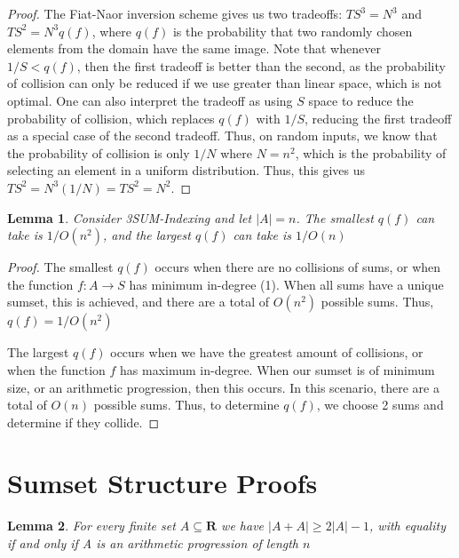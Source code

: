 \documentclass{article}
\newtheorem{lemma}{Lemma}
\begin{document}
\begin{proof}
The Fiat-Naor inversion scheme gives us two tradeoffs: $TS^3 = N^3$ and $TS^2 = N^3q(f)$, where $q(f)$ is the probability that two randomly chosen elements from the domain have the same image. Note that whenever $1/S < q(f)$, then the first tradeoff is better than the second, as the probability of collision can only be reduced if we use greater than linear space, which is not optimal. One can also interpret the tradeoff as using $S$ space to reduce the probability of collision, which replaces $q(f)$ with $1/S$, reducing the first tradeoff as a special case of the second tradeoff. Thus, on random inputs, we know that the probability of collision is only $1/N$ where $N=n^2$, which is the probability of selecting an element in a uniform distribution. Thus, this gives us $TS^2 = N^3(1/N) = TS^2 = N^2$.
\end{proof}

\begin{lemma}
\label{Min and Max q(f) values}
Consider 3SUM-Indexing and let $|A| = n$. The smallest $q(f)$ can take is $1/O(n^2)$, and the largest $q(f)$ can take is $1/O(n)$
\end{lemma}

\begin{proof} %
The smallest $q(f)$ occurs when there are no collisions of sums, or when the function $f: A \rightarrow S$ has minimum in-degree (1). When all sums have a unique sumset, this is achieved, and there are a total of $O(n^2)$ possible sums. Thus, $q(f) = 1/O(n^2)$

The largest $q(f)$ occurs when we have the greatest amount of collisions, or when the function $f$ has maximum in-degree. When our sumset is of minimum size, or an arithmetic progression, then this occurs. In this scenario, there are a total of $O(n)$ possible sums. Thus, to determine $q(f)$, we choose 2 sums and determine if they collide.
\end{proof}

\section{Sumset Structure Proofs}
\label{sec:sumset}

\begin{lemma}
\label{Arithmetic Progression}
For every finite set $A \subseteq \mathbf{R}$ we have $|A+A| \geq 2|A|-1$, with equality if and only if A is an arithmetic progression of length $n$
\end{lemma}
\end{document}
